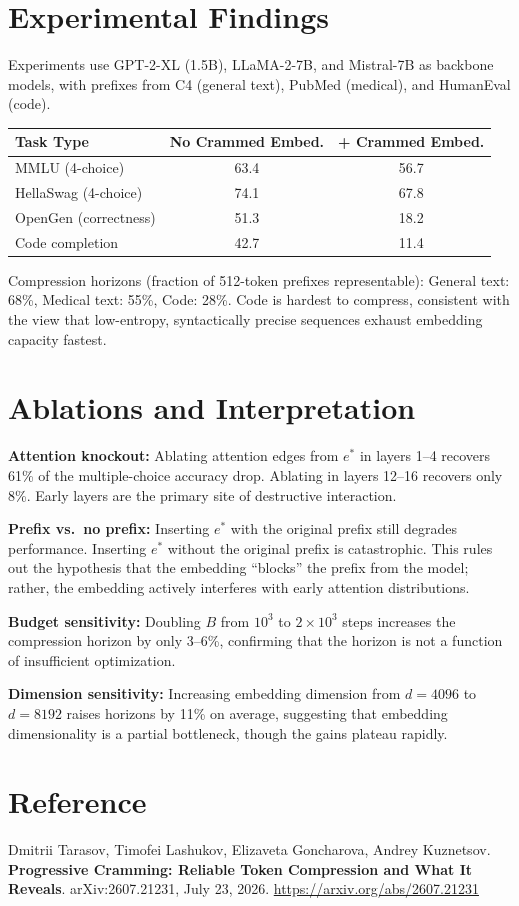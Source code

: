 \documentclass[10pt,twocolumn]{article}
\begin{document}
\section{Experimental Findings}

Experiments use GPT-2-XL (1.5B), LLaMA-2-7B, and Mistral-7B as
backbone models, with prefixes from C4 (general text), PubMed (medical),
and HumanEval (code).

\begin{center}
\small
\begin{tabular}{lcc}
\toprule
Task Type & No Crammed Embed. & + Crammed Embed. \\
\midrule
MMLU (4-choice) & 63.4 & 56.7 \\
HellaSwag (4-choice) & 74.1 & 67.8 \\
OpenGen (correctness) & 51.3 & 18.2 \\
Code completion & 42.7 & 11.4 \\
\bottomrule
\end{tabular}
\end{center}

Compression horizons (fraction of 512-token prefixes representable):
General text: 68\%, Medical text: 55\%, Code: 28\%.
Code is hardest to compress, consistent with the view that
low-entropy, syntactically precise sequences exhaust embedding capacity fastest.

\section{Ablations and Interpretation}

\textbf{Attention knockout:} Ablating attention edges from $e^*$ in
layers 1--4 recovers 61\% of the multiple-choice accuracy drop.
Ablating in layers 12--16 recovers only 8\%.
Early layers are the primary site of destructive interaction.

\textbf{Prefix vs.\ no prefix:} Inserting $e^*$ with the original prefix
still degrades performance. Inserting $e^*$ without the original prefix
is catastrophic. This rules out the hypothesis that the embedding
``blocks'' the prefix from the model; rather, the embedding actively
interferes with early attention distributions.

\textbf{Budget sensitivity:} Doubling $B$ from $10^3$ to $2 \times 10^3$
steps increases the compression horizon by only 3--6\%, confirming that
the horizon is not a function of insufficient optimization.

\textbf{Dimension sensitivity:} Increasing embedding dimension from
$d = 4096$ to $d = 8192$ raises horizons by 11\% on average,
suggesting that embedding dimensionality is a partial bottleneck,
though the gains plateau rapidly.

\section*{Reference}

Dmitrii Tarasov, Timofei Lashukov, Elizaveta Goncharova, Andrey Kuznetsov.
\textbf{Progressive Cramming: Reliable Token Compression and What It Reveals}.
arXiv:2607.21231, July 23, 2026.
\url{https://arxiv.org/abs/2607.21231}
\end{document}
